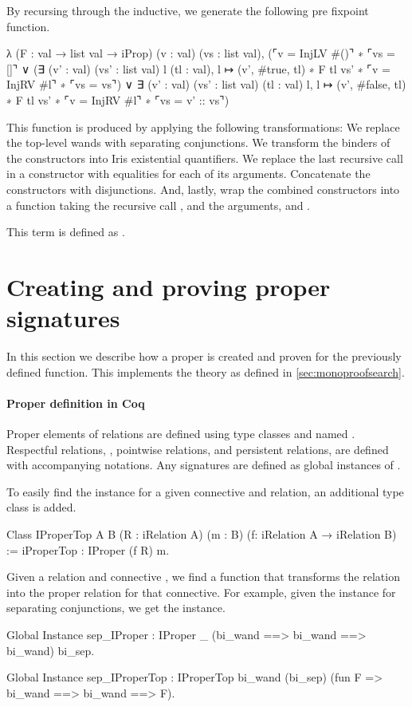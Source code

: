 \documentclass[thesis.tex]{subfiles}
\begin{document}
By recursing through the inductive, we generate the following pre fixpoint function.
\begin{coqcode}
  λ (F : val → list val → iProp) (v : val) (vs : list val),
    (⌜v = InjLV #()⌝ ∗ ⌜vs = []⌝
      ∨ (∃ (v' : val) (vs' : list val) l (tl : val), 
            l ↦ (v', #true, tl) ∗ F tl vs' ∗ 
            ⌜v = InjRV #l⌝ ∗ ⌜vs = vs⌝)
      ∨ ∃ (v' : val) (vs' : list val) (tl : val) l, 
            l ↦ (v', #false, tl) ∗ F tl vs' ∗ 
            ⌜v = InjRV #l⌝ ∗ ⌜vs = v' :: vs⌝)
\end{coqcode}
This function is produced by applying the following transformations:
We replace the top-level wands with separating conjunctions. We transform the binders of the constructors into Iris existential quantifiers. We replace the last recursive call in a constructor with equalities for each of its arguments. Concatenate the constructors with disjunctions. And, lastly, wrap the combined constructors into a function taking the recursive call , and the arguments,  and .

This term is defined as .

\section{Creating and proving proper signatures}\label{sec:constrsig}
In this section we describe how a proper is created and proven for the previously defined function. This implements the theory as defined in \cref{sec:monoproofsearch}.

\paragraph{Proper definition in Coq}
Proper elements of relations are defined using type classes and named . Respectful relations, , pointwise relations,  and persistent relations,  are defined with accompanying notations. Any signatures are defined as global instances of .

To easily find the  instance for a given connective and relation, an additional type class is added.
\begin{coqcode}
  Class IProperTop {A} {B} (R : iRelation A) (m : B) 
                   (f: iRelation A → iRelation B) := 
    iProperTop : IProper (f R) m.
\end{coqcode}
Given a relation  and connective , we find a function  that transforms the relation into the proper relation for that connective. For example, given the  instance for separating conjunctions, we get the  instance.
\begin{coqcode}
  Global Instance sep_IProper : 
    IProper _ (bi_wand ==> bi_wand ==> bi_wand) 
             bi_sep.

  Global Instance sep_IProperTop : 
    IProperTop bi_wand (bi_sep) 
               (fun F => bi_wand ==> bi_wand ==> F).
\end{coqcode}
\end{document}
